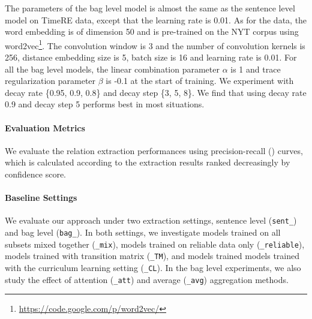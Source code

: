 The parameters of the bag level model is almost the same as the sentence level model on TimeRE data, except that the learning rate is 0.01. As for the \EntityRE data, the word embedding is of dimension 50 and is pre-trained on the NYT corpus using word2vec\footnote{\url{ https://code.google.com/p/word2vec/}}. The convolution window is 3 and the number of convolution kernels is 256, distance embedding size is 5, batch size is 16 and learning rate is 0.01. For all the bag level models, the linear combination parameter $\alpha$ is 1 and trace regularization parameter $\beta$ is -0.1 at the start of training. We experiment with decay rate \{0.95, 0.9, 0.8\} and decay step \{3, 5, 8\}. We find that using decay rate 0.9 and decay step 5 performs best in most situations.

\paragraph{Evaluation Metrics}
We evaluate the relation extraction performances using precision-recall (\PR) curves, which is calculated according to the extraction results ranked decreasingly by confidence score.

\paragraph{Baseline Settings}
We evaluate our approach under two extraction settings, sentence level
(\texttt{sent\_}) and bag level (\texttt{bag\_}). In both settings, we
investigate models trained on all subsets mixed together (\texttt{\_mix}),
models trained on reliable data only (\texttt{\_reliable}), models trained
with transition matrix (\texttt{\_TM}), and models trained models trained
with the curriculum learning setting  (\texttt{\_CL}). In the bag level
experiments, we also study the effect of attention (\texttt{\_att}) and
average
(\texttt{\_avg}) aggregation methods.

